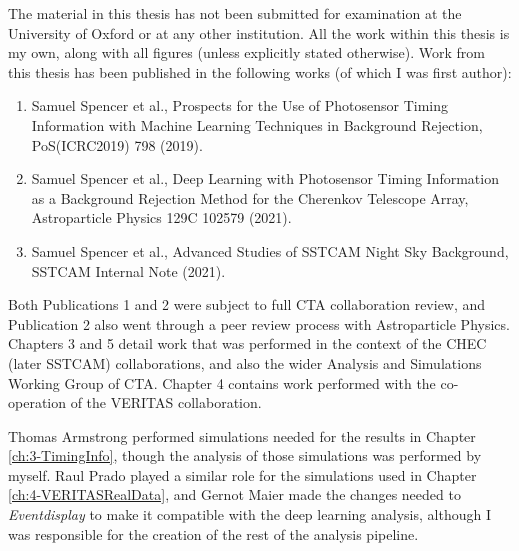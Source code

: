 The material in this thesis has not been submitted for examination at the University of Oxford or at any other institution. All the work within this thesis is my own, along with all figures (unless explicitly stated otherwise). Work from this thesis has been published in the following works (of which I was first author):

\begin{centering}
\begin{enumerate}
    \item Samuel Spencer et al., Prospects for the Use of Photosensor Timing Information with Machine Learning Techniques in Background Rejection, PoS(ICRC2019) 798 (2019).
    \item Samuel Spencer et al., Deep Learning with Photosensor Timing Information as a Background Rejection Method for the Cherenkov Telescope Array, Astroparticle Physics 129C 102579 (2021).
    \item Samuel Spencer et al., Advanced Studies of SSTCAM Night Sky Background, SSTCAM Internal Note (2021). 
\end{enumerate}
\end{centering}
Both Publications 1 and 2 were subject to full CTA collaboration review, and Publication 2 also went through a peer review process with Astroparticle Physics. Chapters 3 and 5 detail work that was performed in the context of the CHEC (later SSTCAM) collaborations, and also the wider Analysis and Simulations Working Group of CTA. Chapter 4 contains work performed with the co-operation of the VERITAS collaboration.

Thomas Armstrong performed simulations needed for the results in Chapter \ref{ch:3-TimingInfo}, though the analysis of those simulations was performed by myself. Raul Prado played a similar role for the simulations used in Chapter \ref{ch:4-VERITASRealData}, and Gernot Maier made the changes needed to \textit{Eventdisplay} to make it compatible with the deep learning analysis, although I was responsible for the creation of the rest of the analysis pipeline.